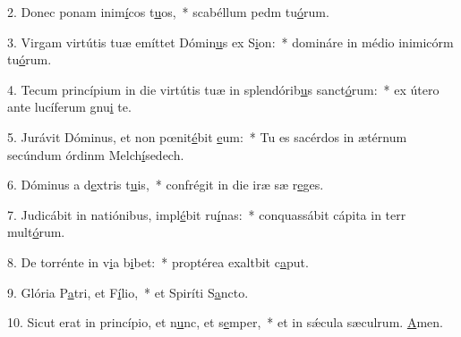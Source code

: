 2. Donec ponam inim\uline{í}cos t\uline{u}os,~* scabéllum pedm tu\uline{ó}rum.\par 
3. Virgam virtútis tuæ emíttet Dómin\uline{u}s ex S\uline{i}on:~* domináre in médio inimicórm tu\uline{ó}rum.\par 
4. Tecum princípium in die virtútis tuæ in splendórib\uline{u}s sanct\uline{ó}rum:~* ex útero ante lucíferum gnu\uline{i} te.\par 
5. Jurávit Dóminus, et non pœnit\uline{é}bit \uline{e}um:~* Tu es sacérdos in ætérnum secúndum órdinm Melch\uline{í}sedech.\par 
6. Dóminus a d\uline{e}xtris t\uline{u}is,~* confrégit in die iræ sæ r\uline{e}ges.\par 
7. Judicábit in natiónibus, impl\uline{é}bit ru\uline{í}nas:~* conquassábit cápita in terr mult\uline{ó}rum.\par 
8. De torrénte in v\uline{i}a b\uline{i}bet:~* proptérea exaltbit c\uline{a}put.\par 
9. Glória P\uline{a}tri, et F\uline{í}lio,~* et Spiríti S\uline{a}ncto.\par 
10. Sicut erat in princípio, et n\uline{u}nc, et s\uline{e}mper,~* et in sǽcula sæculrum. \uline{A}men.\par 
